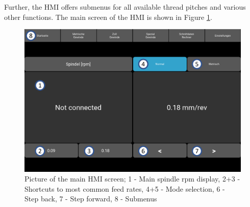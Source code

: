 Further, the HMI offers submenus for all available thread pitches and various other functions. The main screen of the HMI is shown in Figure \ref{HMI main Screen}.

\begin{figure}
    \begin{center}
    \includegraphics[width=12cm]{Pictures/HMI.png}
    \caption[Picture of the main HMI screen]{Picture of the main HMI screen; 1 - Main spindle rpm display, 2+3 - Shortcuts to most common feed rates, 4+5 - Mode selection, 6 - Step back, 7 - Step forward, 8 - Submenus}
    \label{HMI main Screen}
    \end{center}
\end{figure}

